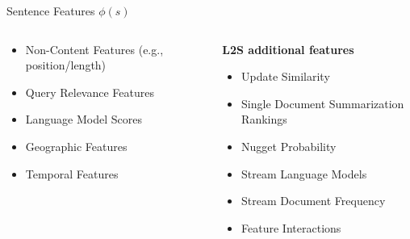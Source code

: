 \begin{frame}{Sentence Features $\phi(s)$ }

\begin{columns}
\begin{column}{0.5\textwidth}
\begin{itemize}

    \item Non-Content Features (e.g., position/length)
\item Query Relevance Features
\item Language Model Scores 
\item Geographic Features
\item Temporal Features
\end{itemize}
\end{column}
\begin{column}{0.5\textwidth}
    \textbf{L2S additional features}
\begin{itemize}
\item Update Similarity
\item Single Document Summarization Rankings
\item Nugget Probability
\item Stream Language Models
\item Stream Document Frequency
\item Feature Interactions 

\end{itemize}
\end{column}
\end{columns}

\end{frame}

